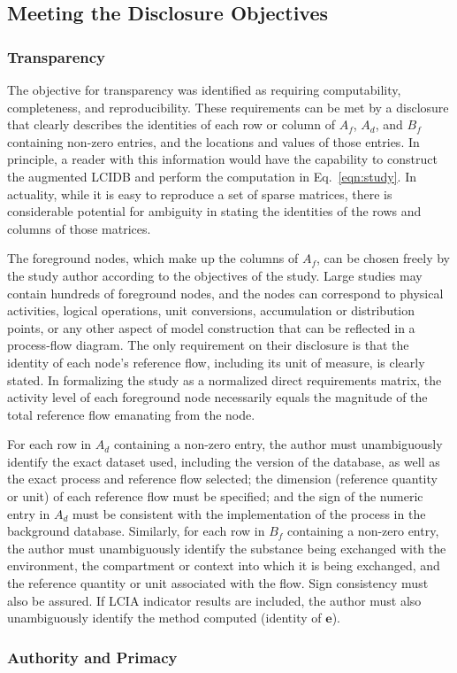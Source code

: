 \subsection{Meeting the Disclosure Objectives}

\subsubsection{Transparency}

The objective for transparency was identified as requiring computability, completeness, and reproducibility.  These requirements can be met by a disclosure that clearly describes the identities of each row or column of $A_f$, $A_d$, and $B_f$ containing non-zero entries, and the locations and values of those entries.  In principle, a reader with this information would have the capability to construct the augmented LCIDB and perform the computation in Eq.~\ref{eqn:study}.  In actuality, while it is easy to reproduce a set of sparse matrices, there is considerable potential for ambiguity in stating the identities of the rows and columns of those matrices.

The foreground nodes, which make up the columns of $A_f$, can be chosen freely by the study author according to the objectives of the study.  Large studies may contain hundreds of foreground nodes, and the nodes can correspond to physical activities, logical operations, unit conversions, accumulation or distribution points, or any other aspect of model construction that can be reflected in a process-flow diagram.  The only requirement on their disclosure is that the identity of each node's reference flow, including its unit of measure, is clearly stated.  In formalizing the study as a normalized direct requirements matrix, the activity level of each foreground node necessarily equals the magnitude of the total reference flow emanating from the node.

For each row in $A_d$ containing a non-zero entry, the author must unambiguously identify the exact dataset used, including the version of the database, as well as the exact process and reference flow selected; the dimension (reference quantity or unit) of each reference flow must be specified; and the sign of the numeric entry in $A_d$ must be consistent with the implementation of the process in the background database.  Similarly, for each row in $B_f$ containing a non-zero entry, the author must unambiguously identify the substance being exchanged with the environment, the compartment or context into which it is being exchanged, and the reference quantity or unit associated with the flow.  Sign consistency must also be assured.  If LCIA indicator results are included, the author must also unambiguously identify the method computed (identity of $\mathbf{e}$).

\subsubsection{Authority and Primacy}

